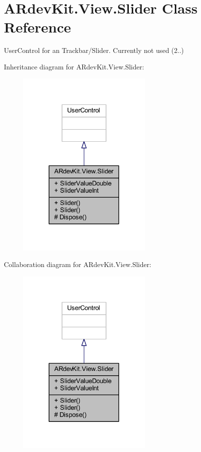 \hypertarget{class_a_rdev_kit_1_1_view_1_1_slider}{\section{A\-Rdev\-Kit.\-View.\-Slider Class Reference}
\label{class_a_rdev_kit_1_1_view_1_1_slider}
}


User\-Control for an Trackbar/\-Slider. Currently not used (2..)  




Inheritance diagram for A\-Rdev\-Kit.\-View.\-Slider\-:
\nopagebreak
\begin{figure}[H]
\begin{center}
\leavevmode
\includegraphics[width=188pt]{class_a_rdev_kit_1_1_view_1_1_slider__inherit__graph}
\end{center}
\end{figure}


Collaboration diagram for A\-Rdev\-Kit.\-View.\-Slider\-:
\nopagebreak
\begin{figure}[H]
\begin{center}
\leavevmode
\includegraphics[width=188pt]{class_a_rdev_kit_1_1_view_1_1_slider__coll__graph}
\end{center}
\end{figure}
